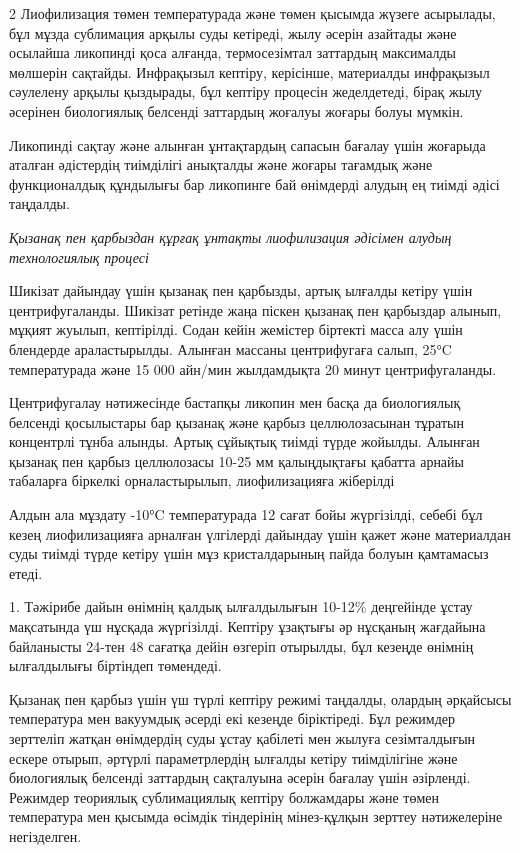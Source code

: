 \begin{multicols}{2}
Лиофилизация төмен температурада және төмен қысымда жүзеге асырылады,
бұл мұзда сублимация арқылы суды кетіреді, жылу әсерін азайтады және
осылайша ликопинді қоса алғанда, термосезімтал заттардың максималды
мөлшерін сақтайды. Инфрақызыл кептіру, керісінше, материалды инфрақызыл
сәулелену арқылы қыздырады, бұл кептіру процесін жеделдетеді, бірақ жылу
әсерінен биологиялық белсенді заттардың жоғалуы жоғары болуы мүмкін.

Ликопинді сақтау және алынған ұнтақтардың сапасын бағалау үшін жоғарыда
аталған әдістердің тиімділігі анықталды және жоғары тағамдық және
функционалдық құндылығы бар ликопинге бай өнімдерді алудың ең тиімді
әдісі таңдалды.

\emph{Қызанақ пен қарбыздан құрғақ ұнтақты лиофилизация әдісімен алудың
технологиялық процесі}

Шикізат дайындау үшін қызанақ пен қарбызды, артық ылғалды кетіру үшін
центрифугаланды. Шикізат ретінде жаңа піскен қызанақ пен қарбыздар
алынып, мұқият жуылып, кептірілді. Содан кейін жемістер біртекті масса
алу үшін блендерде араластырылды. Алынған массаны центрифугаға салып,
25°C температурада және 15 000 айн/мин жылдамдықта 20 минут
центрифугаланды.

Центрифугалау нәтижесінде бастапқы ликопин мен басқа да биологиялық
белсенді қосылыстары бар қызанақ және қарбыз целлюлозасынан тұратын
концентрлі тұнба алынды. Артық сұйықтық тиімді түрде жойылды. Алынған
қызанақ пен қарбыз целлюлозасы 10-25 мм қалыңдықтағы қабатта арнайы
табаларға біркелкі орналастырылып, лиофилизацияға жіберілді

Алдын ала мұздату -10°C температурада 12 сағат бойы жүргізілді, себебі
бұл кезең лиофилизацияға арналған үлгілерді дайындау үшін қажет және
материалдан суды тиімді түрде кетіру үшін мұз кристалдарының пайда
болуын қамтамасыз етеді.

1. Тәжірибе дайын өнімнің қалдық ылғалдылығын 10-12\% деңгейінде ұстау
мақсатында үш нұсқада жүргізілді. Кептіру ұзақтығы әр нұсқаның жағдайына
байланысты 24-тен 48 сағатқа дейін өзгеріп отырылды, бұл кезеңде өнімнің
ылғалдылығы біртіндеп төмендеді.

Қызанақ пен қарбыз үшін үш түрлі кептіру режимі таңдалды, олардың
әрқайсысы температура мен вакуумдық әсерді екі кезеңде біріктіреді. Бұл
режимдер зерттеліп жатқан өнімдердің суды ұстау қабілеті мен жылуға
сезімталдығын ескере отырып, әртүрлі параметрлердің ылғалды кетіру
тиімділігіне және биологиялық белсенді заттардың сақталуына әсерін
бағалау үшін әзірленді. Режимдер теориялық сублимациялық кептіру
болжамдары және төмен температура мен қысымда өсімдік тіндерінің
мінез-құлқын зерттеу нәтижелеріне негізделген.


\end{multicols}
